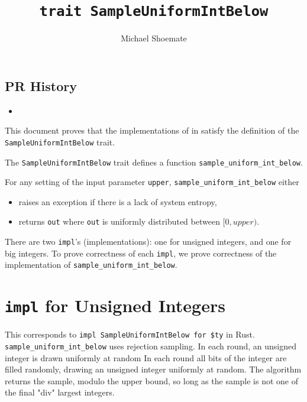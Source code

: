 \documentclass{article}
\title{\texttt{trait SampleUniformIntBelow}}
\author{Michael Shoemate}
\begin{document}
\maketitle

\contrib

\subsection*{PR History}
\begin{itemize}
    \item {}
\end{itemize}

This document proves that the implementations of  in  
satisfy the definition of the \texttt{SampleUniformIntBelow} trait.

\begin{definition}
    \label{sample-uniform-int-below}

    The \texttt{SampleUniformIntBelow} trait defines a function \texttt{sample\_uniform\_int\_below}.

    For any setting of the input parameter \texttt{upper},
    \texttt{sample\_uniform\_int\_below} either
    \begin{itemize}
        \item raises an exception if there is a lack of system entropy,
        \item returns \texttt{out} where \texttt{out} is uniformly distributed between $[0, upper)$.
    \end{itemize}
\end{definition}

There are two \texttt{impl}'s (implementations): one for unsigned integers, and one for big integers.
To prove correctness of each \texttt{impl}, we prove correctness of the implementation of \texttt{sample\_uniform\_int\_below}.

\tableofcontents

\section{\texttt{impl} for Unsigned Integers}
This corresponds to \texttt{impl SampleUniformIntBelow for \$ty} in Rust.
\texttt{sample\_uniform\_int\_below} uses rejection sampling. 
In each round, an unsigned integer is drawn uniformly at random
In each round all bits of the integer are filled randomly, drawing an unsigned integer uniformly at random.
The algorithm returns the sample, modulo the upper bound, so long as the sample is not one of the final "div" largest integers.
\end{document}
